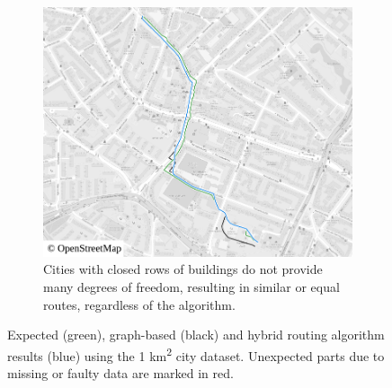 \begin{figure}[h!]
\begin{minipage}[t]{.48\textwidth}
\begin{subfigure}[t]{\linewidth}
\begin{figcenter}
							\includegraphics[width=\textwidth]{images/qgis-routing-city-routing-18}
						\end{figcenter}
						\caption{Cities with closed rows of buildings do not provide many degrees of freedom, resulting in similar or equal routes, regardless of the algorithm.}
						\label{fig:eval-city-usefulness-d}
					\end{subfigure}
				\end{minipage}
				\caption[Comparison of graph-based, actual and expected routes.]{Expected (green), graph-based (black) and hybrid routing algorithm results (blue) using the 1 km\textsuperscript{2} city dataset. Unexpected parts due to missing or faulty data are marked in red.}
				\label{fig:eval-city-usefulness}
			\end{figure}
			
